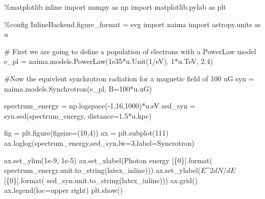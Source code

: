 \documentclass[
  letterpaper,
  DIV=11,
  numbers=noendperiod]{scrreprt}
\newenvironment{Shaded}{\begin{snugshade}}{\end{snugshade}}
\newcommand{\BuiltInTok}[1]{\textcolor[rgb]{0.00,0.23,0.31}{#1}}
\newcommand{\CommentTok}[1]{\textcolor[rgb]{0.37,0.37,0.37}{#1}}
\newcommand{\DecValTok}[1]{\textcolor[rgb]{0.68,0.00,0.00}{#1}}
\newcommand{\FloatTok}[1]{\textcolor[rgb]{0.68,0.00,0.00}{#1}}
\newcommand{\ImportTok}[1]{\textcolor[rgb]{0.00,0.46,0.62}{#1}}
\newcommand{\NormalTok}[1]{\textcolor[rgb]{0.00,0.23,0.31}{#1}}
\newcommand{\OperatorTok}[1]{\textcolor[rgb]{0.37,0.37,0.37}{#1}}
\newcommand{\SpecialCharTok}[1]{\textcolor[rgb]{0.37,0.37,0.37}{#1}}
\newcommand{\StringTok}[1]{\textcolor[rgb]{0.13,0.47,0.30}{#1}}
\begin{document}
\begin{Shaded}
\begin{Highlighting}[]
\OperatorTok{\%}\NormalTok{matplotlib inline}
\ImportTok{import}\NormalTok{ numpy }\ImportTok{as}\NormalTok{ np}
\ImportTok{import}\NormalTok{ matplotlib.pylab }\ImportTok{as}\NormalTok{ plt}


\OperatorTok{\%}\NormalTok{config InlineBackend.figure\_format }\OperatorTok{=} \StringTok{\textquotesingle{}svg\textquotesingle{}}
\ImportTok{import}\NormalTok{ naima}
\ImportTok{import}\NormalTok{ astropy.units }\ImportTok{as}\NormalTok{ u}

\CommentTok{\# First we are going to define a population of electrons with a PowerLaw model                                    }
\NormalTok{e\_pl }\OperatorTok{=}\NormalTok{ naima.models.PowerLaw(}\FloatTok{1e35}\OperatorTok{*}\NormalTok{u.Unit(}\StringTok{\textquotesingle{}1/eV\textquotesingle{}}\NormalTok{), }\DecValTok{1}\OperatorTok{*}\NormalTok{u.TeV, }\FloatTok{2.4}\NormalTok{)}

\CommentTok{\#Now the equivlent synchrotron radiation for a magnetic field of 100 uG}
\NormalTok{syn }\OperatorTok{=}\NormalTok{ naima.models.Synchrotron(e\_pl, B}\OperatorTok{=}\DecValTok{100}\OperatorTok{*}\NormalTok{u.uG)}


\NormalTok{spectrum\_energy }\OperatorTok{=}\NormalTok{ np.logspace(}\OperatorTok{{-}}\DecValTok{1}\NormalTok{,}\DecValTok{16}\NormalTok{,}\DecValTok{1000}\NormalTok{)}\OperatorTok{*}\NormalTok{u.eV}
\NormalTok{sed\_syn }\OperatorTok{=}\NormalTok{ syn.sed(spectrum\_energy, distance}\OperatorTok{=}\FloatTok{1.5}\OperatorTok{*}\NormalTok{u.kpc)}

\NormalTok{fig }\OperatorTok{=}\NormalTok{ plt.figure(figsize}\OperatorTok{=}\NormalTok{(}\DecValTok{10}\NormalTok{,}\DecValTok{4}\NormalTok{))}
\NormalTok{ax }\OperatorTok{=}\NormalTok{ plt.subplot(}\DecValTok{111}\NormalTok{)}
\NormalTok{ax.loglog(spectrum\_energy,sed\_syn,lw}\OperatorTok{=}\DecValTok{3}\NormalTok{,label}\OperatorTok{=}\StringTok{\textquotesingle{}Syncrotron\textquotesingle{}}\NormalTok{)}

\NormalTok{ax.set\_ylim(}\FloatTok{1e{-}9}\NormalTok{, }\FloatTok{1e{-}5}\NormalTok{)}
\NormalTok{ax.set\_xlabel(}\StringTok{\textquotesingle{}Photon energy [}\SpecialCharTok{\{0\}}\StringTok{]\textquotesingle{}}\NormalTok{.}\BuiltInTok{format}\NormalTok{(}
\NormalTok{        spectrum\_energy.unit.to\_string(}\StringTok{\textquotesingle{}latex\_inline\textquotesingle{}}\NormalTok{)))}
\NormalTok{ax.set\_ylabel(}\StringTok{\textquotesingle{}$E\^{}2 dN/dE$ [}\SpecialCharTok{\{0\}}\StringTok{]\textquotesingle{}}\NormalTok{.}\BuiltInTok{format}\NormalTok{(}
\NormalTok{        sed\_syn.unit.to\_string(}\StringTok{\textquotesingle{}latex\_inline\textquotesingle{}}\NormalTok{)))}
\NormalTok{ax.grid()}
\NormalTok{ax.legend(loc}\OperatorTok{=}\StringTok{\textquotesingle{}upper right\textquotesingle{}}\NormalTok{)}
\NormalTok{plt.show()}
\end{Highlighting}
\end{Shaded}
\end{document}

